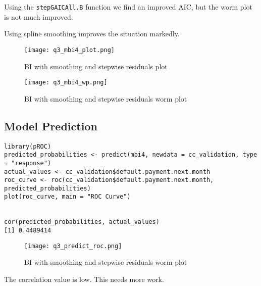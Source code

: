 Using the \verb|stepGAICAll.B| function we find an improved AIC, but the worm plot is not much improved.

Using spline smoothing improves the situation markedly.

\begin{figure}[H]
  \texttt{[image: q3\_mbi4\_plot.png]}
  \caption{BI with smoothing and stepwise residuals plot}
\end{figure}

\begin{figure}[H]
  \texttt{[image: q3\_mbi4\_wp.png]}
  \caption{BI with smoothing and stepwise residuals worm plot}
\end{figure}



\subsection{Model Prediction}


\begin{verbatim}
library(pROC)
predicted_probabilities <- predict(mbi4, newdata = cc_validation, type = "response")
actual_values <- cc_validation$default.payment.next.month
roc_curve <- roc(cc_validation$default.payment.next.month, predicted_probabilities)
plot(roc_curve, main = "ROC Curve")


cor(predicted_probabilities, actual_values)
[1] 0.4489414
\end{verbatim}

\begin{figure}[H]
  \texttt{[image: q3\_predict\_roc.png]}
  \caption{BI with smoothing and stepwise residuals worm plot}
\end{figure}

The correlation value is low.  This needs more work.
